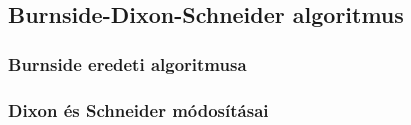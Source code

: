 \subsection{Burnside-Dixon-Schneider algoritmus}
\subsubsection{Burnside eredeti algoritmusa}
\subsubsection{Dixon és Schneider módosításai}
